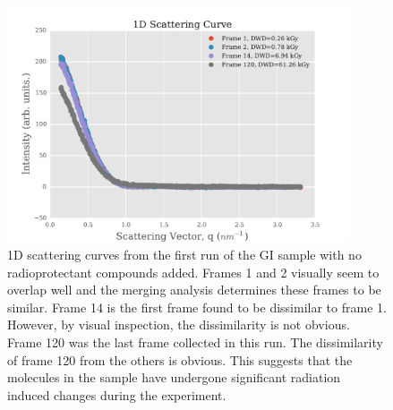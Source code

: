 \begin{figure}
    \centering
    \includegraphics[width=0.9\textwidth]{figures/saxs/scatter_curves.pdf}
    \caption[Increasing dissimilarity of 1D SAXS curves with increasing X-ray exposure.]{1D scattering curves from the first run of the GI sample with no radioprotectant compounds added.
    Frames 1 and 2 visually seem to overlap well and the merging analysis determines these frames to be similar.
    Frame 14 is the first frame found to be dissimilar to frame 1.
    However, by visual inspection, the dissimilarity is not obvious.
    Frame 120 was the last frame collected in this run.
    The dissimilarity of frame 120 from the others is obvious.
    This suggests that the molecules in the sample have undergone significant radiation induced changes during the experiment.}
    \label{fig:1D Scatter Curves}
\end{figure}

